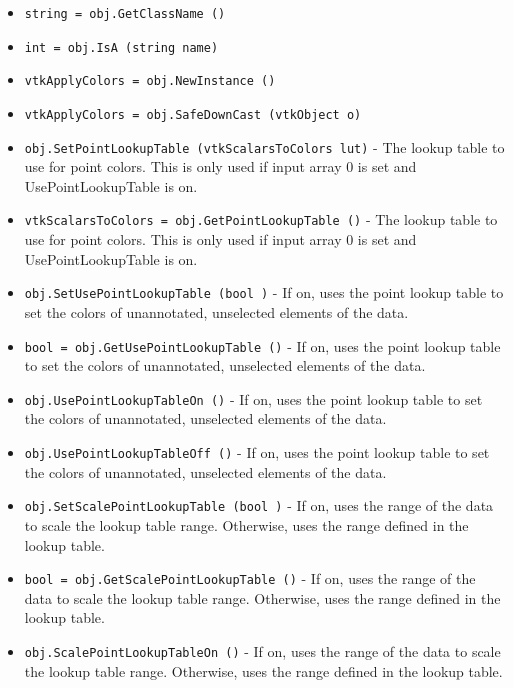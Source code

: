 \begin{itemize}
\item  \verb|string = obj.GetClassName ()|

\item  \verb|int = obj.IsA (string name)|

\item  \verb|vtkApplyColors = obj.NewInstance ()|

\item  \verb|vtkApplyColors = obj.SafeDownCast (vtkObject o)|

\item  \verb|obj.SetPointLookupTable (vtkScalarsToColors lut)| -  The lookup table to use for point colors. This is only used if
 input array 0 is set and UsePointLookupTable is on.

\item  \verb|vtkScalarsToColors = obj.GetPointLookupTable ()| -  The lookup table to use for point colors. This is only used if
 input array 0 is set and UsePointLookupTable is on.

\item  \verb|obj.SetUsePointLookupTable (bool )| -  If on, uses the point lookup table to set the colors of unannotated,
 unselected elements of the data.

\item  \verb|bool = obj.GetUsePointLookupTable ()| -  If on, uses the point lookup table to set the colors of unannotated,
 unselected elements of the data.

\item  \verb|obj.UsePointLookupTableOn ()| -  If on, uses the point lookup table to set the colors of unannotated,
 unselected elements of the data.

\item  \verb|obj.UsePointLookupTableOff ()| -  If on, uses the point lookup table to set the colors of unannotated,
 unselected elements of the data.

\item  \verb|obj.SetScalePointLookupTable (bool )| -  If on, uses the range of the data to scale the lookup table range.
 Otherwise, uses the range defined in the lookup table.

\item  \verb|bool = obj.GetScalePointLookupTable ()| -  If on, uses the range of the data to scale the lookup table range.
 Otherwise, uses the range defined in the lookup table.

\item  \verb|obj.ScalePointLookupTableOn ()| -  If on, uses the range of the data to scale the lookup table range.
 Otherwise, uses the range defined in the lookup table.


\end{itemize}
